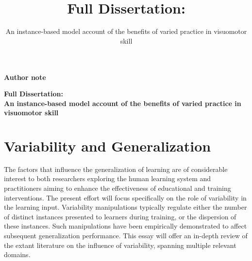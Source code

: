\documentclass[
  12pt,
  letterpaper,
]{article}
\title{Full Dissertation:}
\subtitle{An instance-based model account of the benefits of varied
practice in visuomotor skill}
\date{}
\renewcommand*\contentsname{Table of contents}
\newcommand\contentsname{Table of contents}
\begin{document}

\begin{titlepage}
\center

{\let\newpage\relax\maketitle}

\thispagestyle{title}

\vspace{0.25in}


\vspace{0.5in}

\begin{center}

\textbf{Author note}


\end{center}




\vfill  %

\end{titlepage}

\doublespacing


\begin{center}
\singlespacing
\textbf{Full Dissertation:\\An instance-based model account of the
benefits of varied practice in visuomotor skill}
\end{center}




\renewcommand*\contentsname{Contents}
{
\hypersetup{linkcolor=}
\setcounter{tocdepth}{3}
\tableofcontents
}
\section{Variability and
Generalization}\label{variability-and-generalization}

The factors that influence the generalization of learning are of
considerable interest to both researchers exploring the human learning
system and practitioners aiming to enhance the effectiveness of
educational and training interventions. The present effort will focus
specifically on the role of variability in the learning input.
Variability manipulations typically regulate either the number of
distinct instances presented to learners during training, or the
dispersion of these instances. Such manipulations have been empirically
demonstrated to affect subsequent generalization performance. This essay
will offer an in-depth review of the extant literature on the influence
of variability, spanning multiple relevant domains.
\end{document}
